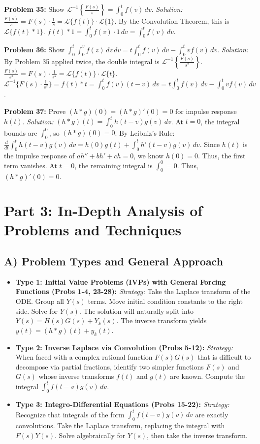 \documentclass[11pt, letterpaper]{article}
\theoremstyle{definition}
\theoremstyle{remark}
\begin{document}
\textbf{Problem 35:} Show $\mathscr{L}^{-1}\left\{\frac{F(s)}{s}\right\} = \int_0^t f(v) \, dv$.
\textit{Solution:}
$\frac{F(s)}{s} = F(s) \cdot \frac{1}{s} = \mathscr{L}\{f(t)\} \cdot \mathscr{L}\{1\}$. By the Convolution Theorem, this is $\mathscr{L}\{f(t) * 1\}$.
$f(t) * 1 = \int_0^t f(v) \cdot 1 \, dv = \int_0^t f(v) \, dv$.

\textbf{Problem 36:} Show $\int_0^t \int_0^v f(z) \, dz \, dv = t\int_0^t f(v) \, dv - \int_0^t v f(v) \, dv$.
\textit{Solution:}
By Problem 35 applied twice, the double integral is $\mathscr{L}^{-1}\left\{\frac{F(s)}{s^2}\right\}$.
$\frac{F(s)}{s^2} = F(s) \cdot \frac{1}{s^2} = \mathscr{L}\{f(t)\} \cdot \mathscr{L}\{t\}$.
$\mathscr{L}^{-1}\{F(s) \cdot \frac{1}{s^2}\} = f(t) * t = \int_0^t f(v)(t-v) \, dv = t\int_0^t f(v) \, dv - \int_0^t v f(v) \, dv$.

\textbf{Problem 37:} Prove $(h * g)(0) = (h * g)'(0) = 0$ for impulse response $h(t)$.
\textit{Solution:}
$(h * g)(t) = \int_0^t h(t-v)g(v) \, dv$. At $t=0$, the integral bounds are $\int_0^0$, so $(h * g)(0) = 0$.
By Leibniz's Rule: $\frac{d}{dt} \int_0^t h(t-v)g(v) \, dv = h(0)g(t) + \int_0^t h'(t-v)g(v) \, dv$.
Since $h(t)$ is the impulse response of $ah''+bh'+ch=0$, we know $h(0)=0$. Thus, the first term vanishes. At $t=0$, the remaining integral is $\int_0^0 = 0$. Thus, $(h * g)'(0) = 0$.

\newpage
\section{Part 3: In-Depth Analysis of Problems and Techniques}

\subsection{A) Problem Types and General Approach}
\begin{itemize}
    \item \textbf{Type 1: Initial Value Problems (IVPs) with General Forcing Functions (Probs 1-4, 23-28):}
    \textit{Strategy:} Take the Laplace transform of the ODE. Group all $Y(s)$ terms. Move initial condition constants to the right side. Solve for $Y(s)$. The solution will naturally split into $Y(s) = H(s)G(s) + Y_k(s)$. The inverse transform yields $y(t) = (h * g)(t) + y_k(t)$.
    
    \item \textbf{Type 2: Inverse Laplace via Convolution (Probs 5-12):}
    \textit{Strategy:} When faced with a complex rational function $F(s)G(s)$ that is difficult to decompose via partial fractions, identify two simpler functions $F(s)$ and $G(s)$ whose inverse transforms $f(t)$ and $g(t)$ are known. Compute the integral $\int_0^t f(t-v)g(v) \, dv$.
    
    \item \textbf{Type 3: Integro-Differential Equations (Probs 15-22):}
    \textit{Strategy:} Recognize that integrals of the form $\int_0^t f(t-v)y(v) \, dv$ are exactly convolutions. Take the Laplace transform, replacing the integral with $F(s)Y(s)$. Solve algebraically for $Y(s)$, then take the inverse transform.
\end{itemize}
\end{document}
